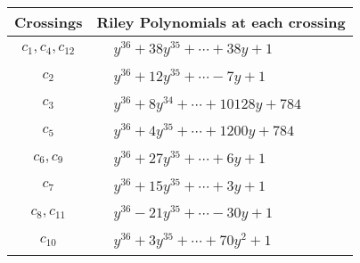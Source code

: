 \documentclass[1p]{elsarticle_modified}
\theoremstyle{definition}
\begin{document}
\begin{tabular}{m{50pt}|m{274pt}}
Crossings & \hspace{64pt}Riley Polynomials at each crossing \\
\hline $$\begin{aligned}c_{1},c_{4},c_{12}\end{aligned}$$&$\begin{aligned}
&y^{36}+38 y^{35}+\cdots+38 y+1
\end{aligned}$\\
\hline $$\begin{aligned}c_{2}\end{aligned}$$&$\begin{aligned}
&y^{36}+12 y^{35}+\cdots-7 y+1
\end{aligned}$\\
\hline $$\begin{aligned}c_{3}\end{aligned}$$&$\begin{aligned}
&y^{36}+8 y^{34}+\cdots+10128 y+784
\end{aligned}$\\
\hline $$\begin{aligned}c_{5}\end{aligned}$$&$\begin{aligned}
&y^{36}+4 y^{35}+\cdots+1200 y+784
\end{aligned}$\\
\hline $$\begin{aligned}c_{6},c_{9}\end{aligned}$$&$\begin{aligned}
&y^{36}+27 y^{35}+\cdots+6 y+1
\end{aligned}$\\
\hline $$\begin{aligned}c_{7}\end{aligned}$$&$\begin{aligned}
&y^{36}+15 y^{35}+\cdots+3 y+1
\end{aligned}$\\
\hline $$\begin{aligned}c_{8},c_{11}\end{aligned}$$&$\begin{aligned}
&y^{36}-21 y^{35}+\cdots-30 y+1
\end{aligned}$\\
\hline $$\begin{aligned}c_{10}\end{aligned}$$&$\begin{aligned}
&y^{36}+3 y^{35}+\cdots+70 y^2+1
\end{aligned}$\\
\hline
\end{tabular}\\~\\
\end{document}
